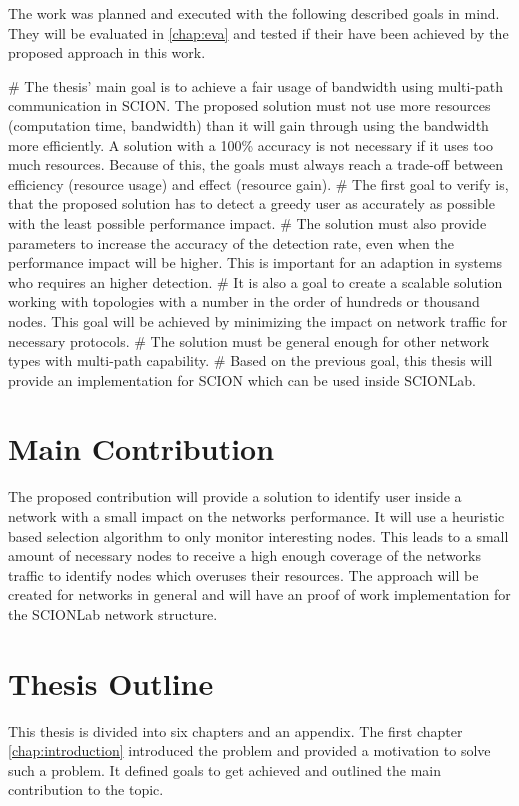 \documentclass[thesis.tex]{subfiles}
\begin{document}
The work was planned and executed with the following described goals in mind. They will be evaluated in \autoref{chap:eva} and tested if their have been achieved by the proposed approach in this work.
     \begin{easylist}
        \MyNumberedListProperties
        # The thesis' main goal is to achieve a fair usage of bandwidth using multi-path communication in SCION. The proposed solution must not use more resources (computation time, bandwidth) than it will gain through using the bandwidth more efficiently. A solution with a 100\% accuracy is not necessary if it uses too much resources. Because of this, the goals must always reach a trade-off between efficiency (resource usage) and effect (resource gain).        
        # The first goal to verify is, that the proposed solution has to detect a greedy user as accurately as possible with the least possible performance impact.
        # The solution must also provide parameters to increase the accuracy of the detection rate, even when the performance impact will be higher. This is important for an adaption in systems who requires an higher detection.
        # It is also a goal to create a scalable solution working with topologies with a number in the order of hundreds or thousand nodes. This goal will be achieved by minimizing the impact on network traffic for necessary protocols.
        # The solution must be general enough for other network types with multi-path capability.        
        # Based on the previous goal, this thesis will provide an implementation for SCION which can be used inside SCIONLab.
    \end{easylist}

\section{Main Contribution}
The proposed contribution will provide a solution to identify user inside a network with a small impact on the networks performance. It will use a heuristic based selection algorithm to only monitor interesting nodes. This leads to a small amount of necessary nodes to receive a high enough coverage of the networks traffic to identify nodes which overuses their resources. The approach will be created for networks in general and will have an proof of work implementation for the SCIONLab network structure.

\section{Thesis Outline}
This thesis is divided into six chapters and an appendix. The first chapter \autoref{chap:introduction} introduced the problem and provided a motivation to solve such a problem. It defined goals to get achieved and outlined the main contribution to the topic.
\end{document}
